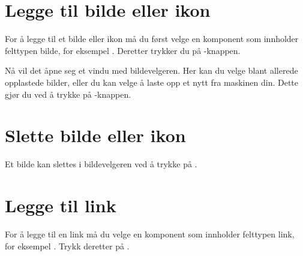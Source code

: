 \section{Legge til bilde eller ikon}
For å legge til et bilde eller ikon må du først velge en komponent som innholder felttypen bilde, for eksempel . Deretter trykker du på -knappen.

\begin{figure}[H]
    \centering
    \label{fig:cms-upload-image}
\end{figure}

 Nå vil det åpne seg et vindu med bildevelgeren. Her kan du velge blant allerede opplastede bilder, eller du kan velge å laste opp et nytt fra maskinen din. Dette gjør du ved å trykke på -knappen.
 
\begin{figure}[H]
    \centering
    \label{fig:cms-upload-new-image}
\end{figure}

\section{Slette bilde eller ikon}
Et bilde kan slettes i bildevelgeren ved å trykke på .

\begin{figure}[H]
    \centering
    \label{fig:cms-delete-image}
\end{figure}




\section{Legge til link}
For å legge til en link må du velge en komponent som innholder felttypen link, for eksempel . Trykk deretter på .
 
